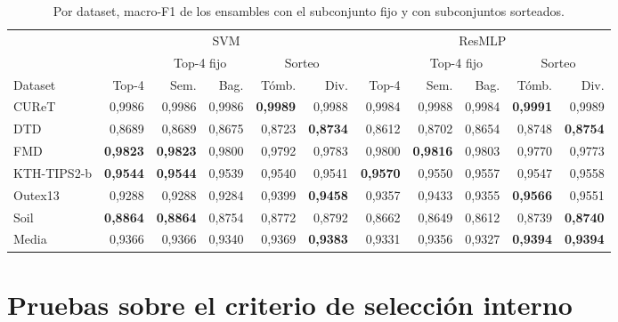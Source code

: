 \documentclass[11pt,a4paper]{article}
\begin{document}
\begin{table}[H]
\centering
\caption{Por dataset, macro-F1 de los ensambles con el subconjunto fijo y con
subconjuntos sorteados.}
\footnotesize
\setlength{\tabcolsep}{3.5pt}
\begin{tabular}{@{}lrrrrrrrrrr@{}}
\toprule
 & \multicolumn{5}{c}{SVM} & \multicolumn{5}{c}{ResMLP} \\
\cmidrule(lr){2-6}\cmidrule(l){7-11}
 & & \multicolumn{2}{c}{Top-4 fijo} & \multicolumn{2}{c}{Sorteo} & & \multicolumn{2}{c}{Top-4 fijo} & \multicolumn{2}{c}{Sorteo} \\
\cmidrule(lr){3-4}\cmidrule(lr){5-6}\cmidrule(lr){8-9}\cmidrule(l){10-11}
Dataset & Top-4 & Sem. & Bag. & Tómb. & Div. & Top-4 & Sem. & Bag. & Tómb. & Div. \\
\midrule
CUReT & 0,9986 & 0,9986 & 0,9986 & \textbf{0,9989} & 0,9988 & 0,9984 & 0,9988 & 0,9984 & \textbf{0,9991} & 0,9989 \\
DTD & 0,8689 & 0,8689 & 0,8675 & 0,8723 & \textbf{0,8734} & 0,8612 & 0,8702 & 0,8654 & 0,8748 & \textbf{0,8754} \\
FMD & \textbf{0,9823} & \textbf{0,9823} & 0,9800 & 0,9792 & 0,9783 & 0,9800 & \textbf{0,9816} & 0,9803 & 0,9770 & 0,9773 \\
KTH-TIPS2-b & \textbf{0,9544} & \textbf{0,9544} & 0,9539 & 0,9540 & 0,9541 & \textbf{0,9570} & 0,9550 & 0,9557 & 0,9547 & 0,9558 \\
Outex13 & 0,9288 & 0,9288 & 0,9284 & 0,9399 & \textbf{0,9458} & 0,9357 & 0,9433 & 0,9355 & \textbf{0,9566} & 0,9551 \\
Soil & \textbf{0,8864} & \textbf{0,8864} & 0,8754 & 0,8772 & 0,8792 & 0,8662 & 0,8649 & 0,8612 & 0,8739 & \textbf{0,8740} \\
\midrule
Media & 0,9366 & 0,9366 & 0,9340 & 0,9369 & \textbf{0,9383} & 0,9331 & 0,9356 & 0,9327 & \textbf{0,9394} & \textbf{0,9394} \\
\bottomrule
\end{tabular}
\end{table}

\section{Pruebas sobre el criterio de selección interno}
\end{document}
